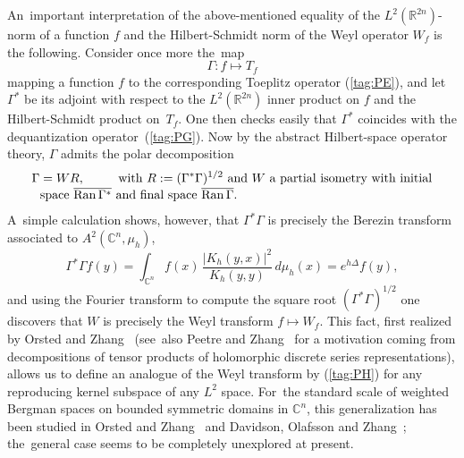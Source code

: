 \documentclass[11pt]{amsart}
\numberwithin{equation}{section}
\theoremstyle{remark}
\newcommand\RR{\mathbb R}
\newcommand{\CC}{\C}
\newcommand{\C}{\mathbb C}
\begin{document}
An~important interpretation of the above-mentioned equality of the
$L^2(\RR^{2n})$-norm of a function $f$ and the Hilbert-Schmidt norm of the Weyl
operator $W_f$ is the following. Consider once more the~map
$$ \Gamma: f\mapsto T_f  $$
mapping a function $f$ to the corresponding Toeplitz operator (\ref{tag:PE}),
and let $\Gamma^*$ be its adjoint with respect to the $L^2(\RR^{2n})$ inner
product on $f$ and the Hilbert-Schmidt product on~$T_f$. One then checks easily
that $\Gamma^*$ coincides with the dequantization operator~(\ref{tag:PG}). Now
by the abstract Hilbert-space operator theory, $\Gamma$ admits the polar
decomposition
\begin{equation}  \begin{aligned}
& \Gamma = W R,  \qquad\text{with $R:=(\Gamma^*\Gamma)^{1/2}$ and $W$ a partial
isometry with initial} \\
\noalign{\vskip-3pt}
& \text{space $\overline{\operatorname{Ran}\Gamma^*}$ and final space
$\overline{\operatorname{Ran}\Gamma}$.}  \end{aligned}  \label{tag:PH}
\end{equation}
A~simple calculation shows, however, that $\Gamma^*\Gamma$ is precisely the
Berezin transform associated to $A^2(\CC^n,\mu_h)$,
$$ \Gamma^*\Gamma f(y) = \int_{\CC^n} f(x) \, \frac{|K_h(y,x)|^2}{K_h(y,y)}
\, d\mu_h(x) = e^{h\Delta} f(y),  $$
and using the Fourier transform to compute the square root
$(\Gamma^*\Gamma)^{1/2}$ one discovers that $W$ is precisely the Weyl transform
$f\mapsto W_f$. This fact, first realized by Orsted and Zhang~\cite{bib:OeZ}
(see~also Peetre and Zhang~\cite{bib:PeeZh} for a motivation coming from
decompositions of tensor products of holomorphic discrete series
representations), allows us to define an analogue of the Weyl transform by
(\ref{tag:PH}) for any reproducing kernel subspace of any $L^2$ space. For~the
standard scale of weighted Bergman spaces on bounded symmetric domains in
$\CC^n$, this generalization has been studied in Orsted and
Zhang~\cite{bib:OeZ} and Davidson, Olafsson and Zhang~\cite{bib:+Olaf};
the~general case seems to be completely unexplored at present.
\end{document}
